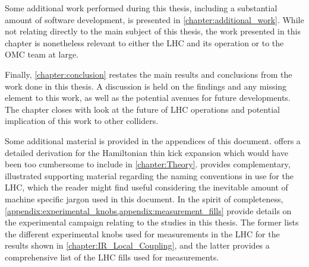 Some additional work performed during this thesis, including a substantial amount of software development, is presented in \cref{chapter:additional_work}.
While not relating directly to the main subject of this thesis, the work presented in this chapter is nonetheless relevant to either the \acrshort{LHC} and its operation or to the \acrshort{OMC} team at large.

Finally, \cref{chapter:conclusion} restates the main results and conclusions from the work done in this thesis.
A discussion is held on the findings and any missing element to this work, as well as the potential avenues for future developments.
The chapter closes with look at the future of LHC operations and potential implication of this work to other colliders.

Some additional material is provided in the appendices of this document.
 offers a detailed derivation for the Hamiltonian thin kick expansion which would have been too cumbersome to include in \cref{chapter:Theory}.
 provides complementary, illustrated supporting material regarding the naming conventions in use for the \acrshort{LHC}, which the reader might find useful considering the inevitable amount of machine specific jargon used in this document.
In the spirit of completeness, \cref{appendix:experimental_knobs,appendix:measurement_fills} provide details on the experimental campaign relating to the studies in this thesis.
The former lists the different experimental knobs used for measurements in the LHC for the results shown in \cref{chapter:IR_Local_Coupling}, and the latter provides a comprehensive list of the LHC fills used for measurements.


